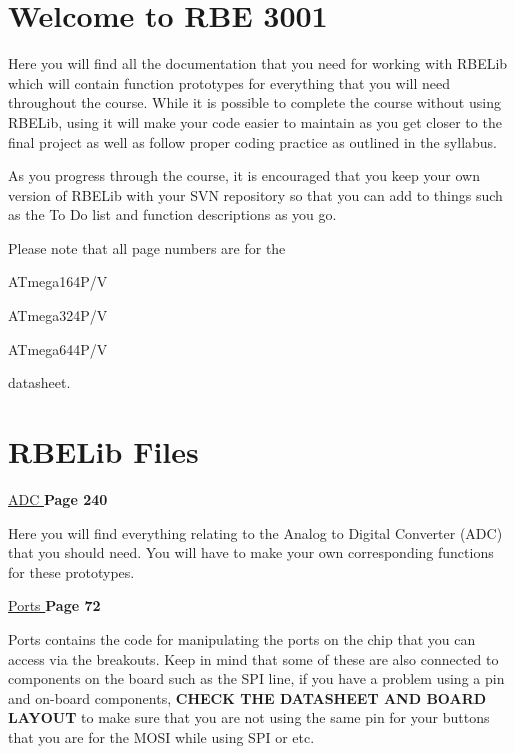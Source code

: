 \hypertarget{index_welcome}{}\section{Welcome to R\-B\-E 3001}\label{index_welcome}
\par
 Here you will find all the documentation that you need for working with R\-B\-E\-Lib which will contain function prototypes for everything that you will need throughout the course. While it is possible to complete the course without using R\-B\-E\-Lib, using it will make your code easier to maintain as you get closer to the final project as well as follow proper coding practice as outlined in the syllabus.

As you progress through the course, it is encouraged that you keep your own version of R\-B\-E\-Lib with your S\-V\-N repository so that you can add to things such as the To Do list and function descriptions as you go.

Please note that all page numbers are for the

A\-Tmega164\-P/\-V \par
 A\-Tmega324\-P/\-V \par
 A\-Tmega644\-P/\-V \par


datasheet. \par
\par
 \par
 \hypertarget{index_rbelib}{}\section{R\-B\-E\-Lib Files}\label{index_rbelib}
\par
 \hyperlink{_a_d_c_8h}{A\-D\-C } {\bfseries  Page 240 }

Here you will find everything relating to the Analog to Digital Converter (A\-D\-C) that you should need. You will have to make your own corresponding functions for these prototypes. 

 \hyperlink{ports_8h}{Ports } {\bfseries  Page 72 }

Ports contains the code for manipulating the ports on the chip that you can access via the breakouts. Keep in mind that some of these are also connected to components on the board such as the S\-P\-I line, if you have a problem using a pin and on-\/board components, {\bfseries  C\-H\-E\-C\-K T\-H\-E D\-A\-T\-A\-S\-H\-E\-E\-T A\-N\-D B\-O\-A\-R\-D L\-A\-Y\-O\-U\-T } to make sure that you are not using the same pin for your buttons that you are for the M\-O\-S\-I while using S\-P\-I or etc.

